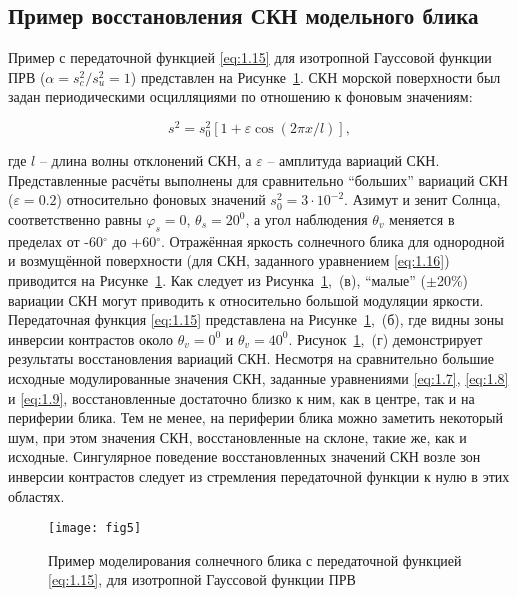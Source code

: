 \subsection{Пример восстановления СКН модельного блика}

Пример с передаточной функцией \eqref{eq:1.15} для изотропной Гауссовой функции ПРВ ($\alpha =s_{c}^{2} /s_{u}^{2} =1$) представлен на Рисунке~\ref{fig:5}. СКН морской поверхности был задан периодическими осцилляциями по отношению к фоновым значениям:


\begin{equation} \label{eq:1.16} 
s^{2} =s_{0}^{2} \left[1+\varepsilon \cos (2\pi x/l)\right],  
\end{equation} 


\noindent где $l$ -- длина волны отклонений СКН, а $\varepsilon $ -- амплитуда вариаций СКН. Представленные расчёты выполнены для сравнительно ``больших'' вариаций СКН ($\varepsilon =0.2$) относительно фоновых значений $s_{0}^{2} =3\cdot 10^{-2} $. Азимут и зенит Солнца, соответственно равны $\varphi _{s} =0$, $\theta _{s} =20^{0} $, а угол наблюдения $\theta _{v} $ меняется в пределах от -60${}^\circ$ до +60${}^\circ$. Отражённая яркость солнечного блика для однородной и возмущённой поверхности (для СКН, заданного уравнением \eqref{eq:1.16}) приводится на Рисунке~\ref{fig:5}. Как следует из Рисунка~\ref{fig:5},~(в), ``малые'' ($\pm$20\%) вариации СКН могут приводить к относительно большой модуляции яркости. Передаточная функция \eqref{eq:1.15} представлена на Рисунке~\ref{fig:5},~(б), где видны зоны инверсии контрастов около $\theta _{v} =0^{0} $ и $\theta _{v} =40^{0} $. Рисунок~\ref{fig:5},~(г) демонстрирует результаты восстановления вариаций СКН. Несмотря на сравнительно большие исходные модулированные значения СКН, заданные уравнениями \eqref{eq:1.7}, \eqref{eq:1.8} и \eqref{eq:1.9}, восстановленные достаточно близко к ним, как в центре, так и на периферии блика. Тем не менее, на периферии блика можно заметить некоторый шум, при этом значения СКН, восстановленные на склоне, такие же, как и исходные. Сингулярное поведение восстановленных значений СКН возле зон инверсии контрастов следует из стремления передаточной функции к нулю в этих областях.



\begin{figure}[!thb]
    \texttt{[image: fig5]}
    \caption{Пример моделирования солнечного блика с передаточной функцией \eqref{eq:1.15}, для изотропной Гауссовой функции ПРВ}
    \label{fig:5}
\end{figure}

